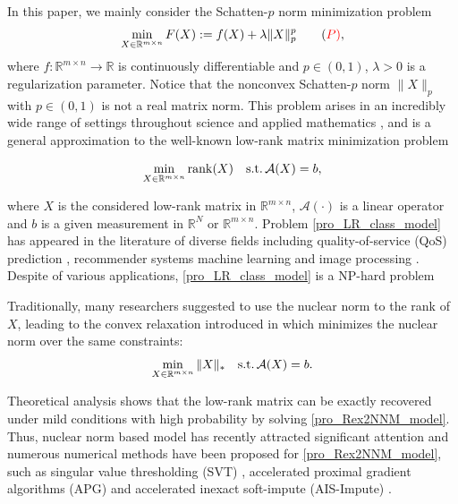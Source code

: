 \documentclass[twoside,11pt]{article}
\numberwithin{equation}{section}
\begin{document}
In this paper, we mainly consider the  Schatten-$p$ norm  minimization problem  
\begin{equation}\label{pro_pri}
  \min\limits_{X\in \mathbb{R}^{m\times n} }  F (X):= f (X)+\lambda\|X\|_{p}^{p} \tag{\color{red}{$P$}}, 
\end{equation}
where $f:\mathbb{R}^{m\times n}\to \mathbb{R}$ is continuously differentiable and $p\in(0,1)$, $\lambda > 0$ is a regularization  parameter.  
Notice that the nonconvex Schatten-$p$ norm $ \|X\|_{p}$ with   $p\in(0,1)$ is not a real matrix norm.  This problem arises in an incredibly wide range of settings throughout science and applied mathematics \cite{chiang2018using,jun2019bilinear,lee2016llorma,pal2023online,tong2021accelerating}, 
and is a general approximation to the well-known low-rank matrix minimization problem

\begin{equation}\label{pro_LR_class_model}
  \min_{X\in\mathbb{R}^{m\times n} } {\rm rank} (X) \quad {\rm s.t.}\, \mathcal{A} (X) = b,
\end{equation}

where $X$ is the considered low-rank matrix 
in $\mathbb{R}^{m\times n}$, $\mathcal{A} (\cdot)$ is a 
linear operator and $b $ is a given measurement in $\mathbb{R}^{N}$ or $\mathbb{R}^{m\times n}$.
Problem \eqref{pro_LR_class_model} has appeared in the literature of diverse fields including 
quality-of-service  (QoS) prediction  \cite{LRMM_APP2QoSDATA_IEEE2017}, 
recommender systems \cite{lee2016llorma}
machine learning  \cite{LRMM_APP_ML_ICML2007,indyk2019learning} 
and image processing  
\cite{LRMR_APP2ImgProcess_TIP2014,LRMR_APP2ImgProcess_SP2020}.   
Despite of  various  applications,  \eqref{pro_LR_class_model}  
is a NP-hard problem \cite{review_LRR_2021}


Traditionally, many researchers suggested to use the nuclear norm to the rank of $X$, leading to the  convex relaxation introduced in  \cite{ExpCriterion_2010} which minimizes the nuclear norm over the same constraints:
\begin{equation} \label{pro_Rex2NNM_model}
  \min_{X\in\mathbb{R}^{m\times n} } \|X\|_{*} \quad {\rm s.t.}\, \mathcal{A} (X) = b.
\end{equation}

Theoretical analysis \cite{LRMMRex2NNM_Phd2002} shows that  the low-rank matrix can be exactly recovered  under mild conditions with high probability by solving  \eqref{pro_Rex2NNM_model}.
Thus, nuclear norm based model has recently attracted significant attention
\cite{sp1_2021_PSNR} and  numerous numerical  methods have been proposed for \eqref{pro_Rex2NNM_model}, such as singular value thresholding (SVT)  \cite{LRM_Rex2NNM_SVTAlg_2010}, accelerated proximal gradient algorithms  (APG) \cite{NNReg_LST_ACCProx_2010} and accelerated inexact soft-impute  (AIS-Impute)  \cite{LRM_Rex2NNM_Alg_AISImpute_2019}.
\end{document}
